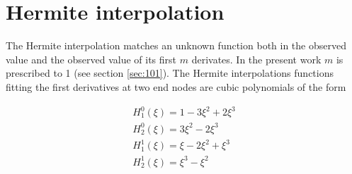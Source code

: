 \chapter{Hermite interpolation}
\label{chap:appA}


The Hermite interpolation matches an unknown function both in the
observed value and the observed value of its first $m$ derivates. In
the present work $m$ is prescribed to 1 (see section \ref{sec:101}).
The Hermite interpolations functions fitting the first derivatives at
two end nodes are cubic polynomials of the form

$$\begin{array}{l}
H^0_1(\xi) = 1 - 3\xi^2 + 2\xi^3 \\[2mm]
H^0_2(\xi) = 3\xi^2 - 2\xi^3 \\[2mm]
H^1_1(\xi) = \xi - 2\xi^2 + \xi^3 \\[2mm]
H^1_2(\xi) = \xi^3 - \xi^2
\end{array}$$

